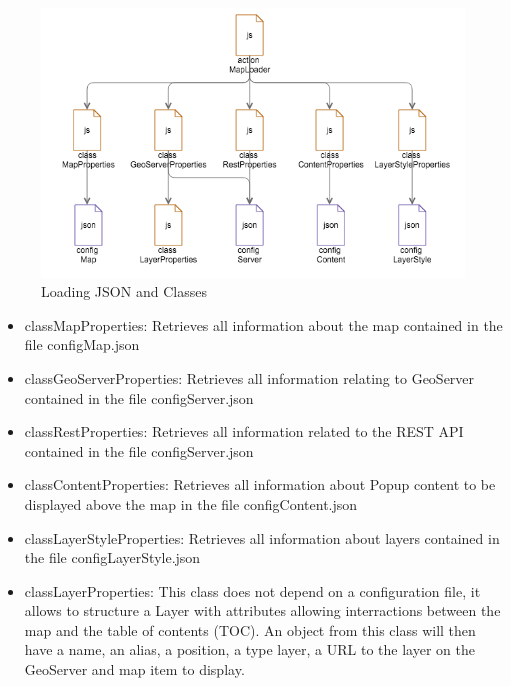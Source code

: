 \begin{figure}[ht]
  \centering
  \includegraphics[width=12cm]{img/c02-application/png/app-class-loading.png}
  \caption{Loading JSON and Classes}
\end{figure}

\begin {itemize}
  \item classMapProperties: Retrieves all information about the map contained in the file configMap.json
  \item classGeoServerProperties: Retrieves all information relating to GeoServer contained in the file configServer.json
  \item classRestProperties: Retrieves all information related to the REST API contained in the file configServer.json
  \item classContentProperties: Retrieves all information about Popup content to be displayed above the map in the file configContent.json
  \item classLayerStyleProperties: Retrieves all information about layers contained in the file configLayerStyle.json
  \item classLayerProperties: This class does not depend on a configuration file, it allows to structure a Layer with attributes allowing interractions between the map and the table of contents (TOC). An object from this class will then have a name, an alias, a position, a type layer, a URL to the layer on the GeoServer and map item to display.
\end {itemize}




